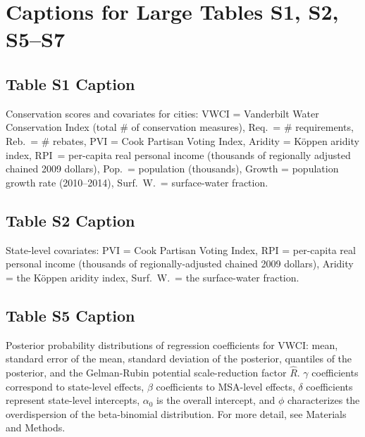 \documentclass[draft]{agujournal}
\begin{document}
%
%
\iffalse
%
\section*{Captions for Large Tables S1, S2, S5--S7}
\subsection*{Table S1 Caption}
\setcounter{table}{0}%
\begin{table}[H]
\centering
\caption{Conservation scores and covariates for  cities: VWCI = Vanderbilt Water Conservation Index (total \# of conservation measures), Req.\ = \# requirements, Reb.\ = \# rebates, PVI = Cook Partisan Voting Index, Aridity = K\"oppen aridity index, RPI\ = per-capita real personal income (thousands of regionally adjusted chained 2009 dollars), Pop.\ = population (thousands), Growth = population growth rate (2010--2014), Surf.\ W.\ = surface-water fraction.}
\end{table}


\subsection*{Table S2 Caption}
\setcounter{table}{1}%
\begin{table}[H]
\centering
\caption{State-level covariates: PVI = Cook Partisan Voting Index, RPI = per-capita real personal income (thousands of regionally-adjusted chained 2009 dollars), Aridity = the K\"oppen aridity index, Surf.\ W.\ = the surface-water fraction.}
\end{table}


\subsection*{Table S5 Caption}
\setcounter{table}{4}%
\begin{table}[H]
\centering
\caption{Posterior probability distributions of regression coefficients for VWCI: mean, standard error of the mean, standard deviation of the posterior, quantiles of the posterior, and the Gelman-Rubin potential scale-reduction factor $\hat R$. $\gamma$ coefficients correspond to state-level effects, $\beta$ coefficients to MSA-level effects, $\delta$ coefficients represent state-level intercepts, $\alpha_0$ is the overall intercept, and $\phi$ characterizes the overdispersion of the beta-binomial distribution. For more detail, see Materials and Methods.}
\end{table}
\end{document}
